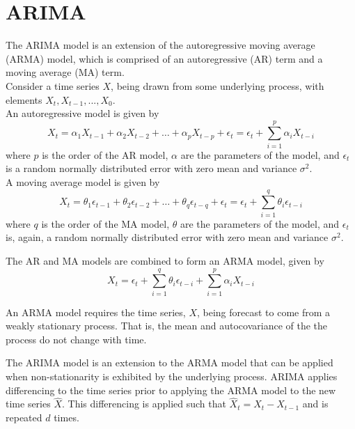 \section{ARIMA}
\par
The ARIMA model is an extension of the autoregressive moving average (ARMA) model, which is comprised of an autoregressive (AR) term and a moving average (MA) term.
\\
Consider a time series $X$, being drawn from some underlying process, with elements $X_{t}, X_{t-1}, ..., X_{0}$. 
\\
An autoregressive model is given by
\begin{equation}
X_{t} = \alpha_{1}X_{t-1} + \alpha_{2}X_{t-2} + \ldots + \alpha_{p}X_{t-p} + \epsilon_{t} = \epsilon_{t} + \sum_{i=1}^{p}\alpha_{i}X_{t-i}
\end{equation}
where $p$ is the order of the AR model, $\alpha$ are the parameters of the model, and $\epsilon_{t}$ is a random normally distributed error with zero mean and variance $\sigma^2$. 
\\ 
A moving average model is given by 
\begin{equation}
X_{t} = \theta_{1}\epsilon_{t-1} + \theta_{2}\epsilon_{t-2} + \ldots + \theta_{q}\epsilon_{t-q} + \epsilon_{t} = \epsilon_{t} + \sum_{i=1}^{q}\theta_{i}\epsilon_{t-i}
\end{equation}
where $q$ is the order of the MA model, $\theta$ are the parameters of the model, and $\epsilon_{t}$ is, again, a random normally distributed error with zero mean and variance $\sigma^2$.
\par
The AR and MA models are combined to form an ARMA model, given by 
\begin{equation}
X_{t} = \epsilon_{t} + \sum_{i=1}^{q}\theta_{i}\epsilon_{t-i} + \sum_{i=1}^{p}\alpha_{i}X_{t-i}
\end{equation}
\par
An ARMA model requires the time series, $X$, being forecast to come from a weakly stationary process.
That is, the mean and autocovariance of the the process do not change with time.
\par
The ARIMA model is an extension to the ARMA model that can be applied when non-stationarity is exhibited by the underlying process.
ARIMA applies differencing to the time series prior to applying the ARMA model to the new time series $\hat{X}$.
This differencing is applied such that $\hat{X}_{t} = X_{t} - X_{t-1}$ and is repeated $d$ times.
